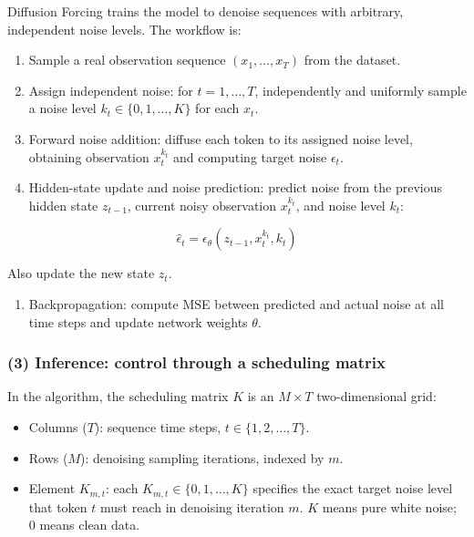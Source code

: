Diffusion Forcing trains the model to denoise sequences with arbitrary, independent noise levels. The workflow is:

\begin{enumerate}
\def\labelenumi{\arabic{enumi}.}
\tightlist
\item
  Sample a real observation sequence \((x_1,\ldots,x_T)\) from the dataset.
\item
  Assign independent noise: for \(t=1,\ldots,T\), independently and uniformly sample a noise level \(k_t\in\{0,1,\ldots,K\}\) for each \(x_t\).
\item
  Forward noise addition: diffuse each token to its assigned noise level, obtaining observation \(x_t^{k_t}\) and computing target noise \(\epsilon_t\).
\item
{}
  Hidden-state update and noise prediction: predict noise from the previous hidden state \(z_{t-1}\), current noisy observation \(x_t^{k_t}\), and noise level \(k_t\):
\end{enumerate}

\[
\hat{\epsilon}_t=\epsilon_\theta(z_{t-1},x_t^{k_t},k_t)
\]

Also update the new state \(z_t\).

\begin{enumerate}
\def\labelenumi{\arabic{enumi}.}
\setcounter{enumi}{4}
\tightlist
\item
  Backpropagation: compute MSE between predicted and actual noise at all time steps and update network weights \(\theta\).
\end{enumerate}

\hypertarget{inference-control-through-a-scheduling-matrix}{%
\subsubsection{(3) Inference: control through a scheduling matrix}\label{inference-control-through-a-scheduling-matrix}}

In the algorithm, the scheduling matrix \(K\) is an \(M\times T\) two-dimensional grid:

\begin{itemize}
\tightlist
\item
  Columns (\(T\)): sequence time steps, \(t\in\{1,2,\ldots,T\}\).
\item
  Rows (\(M\)): denoising sampling iterations, indexed by \(m\).
\item
  Element \(K_{m,t}\): each \(K_{m,t}\in\{0,1,\ldots,K\}\) specifies the exact target noise level that token \(t\) must reach in denoising iteration \(m\). \(K\) means pure white noise; \(0\) means clean data.
\end{itemize}

